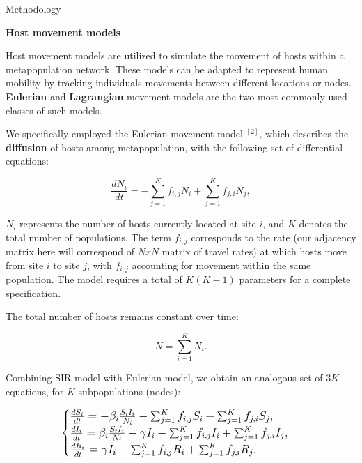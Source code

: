 \documentclass{beamer} %
\begin{document}
\begin{frame}[t]
\begin{columns}[t]
\begin{column}{0.465\textwidth}
\begin{block}{Methodology}
    \bigskip
    
    \textbf{Host movement models}
    
    Host movement models are utilized to simulate the movement of hosts within a metapopulation network. These models can be adapted to represent human mobility by tracking individuals movements between different locations or nodes. \textbf{Eulerian} and \textbf{Lagrangian} movement models are the two most commonly used classes of such models.

    \bigskip

    We specifically employed the Eulerian movement model $^{[2]}$, which describes the \textbf{diffusion} of hosts among metapopulation, with the following set of differential equations:

    \bigskip

    \begin{center}
    \begin{equation}
    \frac{dN_{i}}{dt} = -\sum_{j=1}^{K} f_{i, j} N_{i} + \sum_{j=1}^{K} f_{j, i} N_{j},
    \end{equation}
    \end{center}

    $N_{i}$ represents the number of hosts currently located at site $i$, and $K$ denotes the total number of populations. The term $f_{i, j}$ corresponds to the rate (our adjacency matrix here will correspond of $NxN$ matrix of travel rates) at which hosts move from site $i$ to site $j$, with $f_{i, j}$ accounting for movement within the same population. The model requires a total of $K (K - 1)$ parameters for a complete specification.

    The total number of hosts remains constant over time:
    \begin{center}
    \begin{equation}
        N = \sum_{i=1}^{K} N_{i}.
    \end{equation}
    \end{center}

    Combining SIR model with Eulerian model, we obtain an analogous set of $3K$ equations, for $K$ subpopulations (nodes):

    \begin{equation}
    \large
    \begin{cases}
        \frac{dS_{i}}{dt} = -\beta_{i} \frac{S_{i}I_{i}}{N_{i}} -\sum_{j=1}^{K} f_{i, j} S_{i} + \sum_{j=1}^{K} f_{j, i} S_{j}, \\
        \frac{dI_{i}}{dt} = \beta_{i} \frac{S_{i}I_{i}}{N_{i}} - \gamma I_{i} -\sum_{j=1}^{K} f_{i, j} I_{i} + \sum_{j=1}^{K} f_{j, i} I_{j}, \\
        \frac{dR_{i}}{dt} = \gamma I_{i} -\sum_{j=1}^{K} f_{i, j} R_{i} + \sum_{j=1}^{K} f_{j, i} R_{j}.
    \end{cases}
    \end{equation}


\end{block}
\end{column}
\end{columns}
\end{frame}
\end{document}

